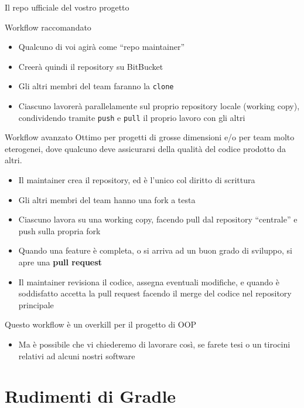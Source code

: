 \documentclass[presentation]{beamer}
\begin{document}
\begin{frame}[allowframebreaks]{Il repo ufficiale del vostro progetto}
	\begin{block}{Workflow raccomandato}
		\begin{itemize}
			\item Qualcuno di voi agirà come ``repo maintainer''
			\item Creerà quindi il repository su BitBucket
			\item Gli altri membri del team faranno la \texttt{clone}
			\item Ciascuno lavorerà parallelamente sul proprio repository locale (working copy), condividendo tramite \texttt{push} e \texttt{pull} il proprio lavoro con gli altri
		\end{itemize}
	\end{block}
	\begin{block}{Workflow avanzato}
		Ottimo per progetti di grosse dimensioni e/o per team molto eterogenei, dove qualcuno deve assicurarsi della qualità del codice prodotto da altri.
		\begin{itemize}
			\item Il maintainer crea il repository, ed è l'unico col diritto di scrittura
			\item Gli altri membri del team hanno una fork a testa
			\item Ciascuno lavora su una working copy, facendo pull dal repository ``centrale'' e push sulla propria fork
			\item Quando una feature è completa, o si arriva ad un buon grado di sviluppo, si apre una \textbf{pull request}
			\item Il maintainer revisiona il codice, assegna eventuali modifiche, e quando è soddisfatto accetta la pull request facendo il merge del codice nel repository principale
		\end{itemize}
		Questo workflow è un overkill per il progetto di OOP
		\begin{itemize}
			\item Ma è possibile che vi chiederemo di lavorare così, se farete tesi o un tirocini relativi ad alcuni nostri software
		\end{itemize}
	\end{block}
\end{frame}

\section{Rudimenti di Gradle}
\end{document}
